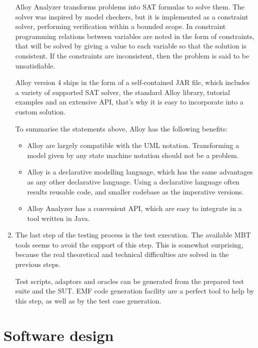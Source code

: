 \begin{enumerate}
Alloy Analyzer transforms problems into SAT formulas to solve them. The solver was inspired by model checkers, but it is implemented as a constraint solver, performing verification within a bounded scope. In constraint programming relations between variables are noted in the form of constraints, that will be solved by giving a value to each variable so that the solution is consistent. If the constraints are inconsistent, then the problem is said to be unsatisfiable.

Alloy version 4 ships in the form of a self-contained JAR file, which includes a variety of supported SAT solver, the standard Alloy library, tutorial examples and an extensive API, that's why it is easy to incorporate into a custom solution.

To summarise the statements above, Alloy has the following benefits:

\begin{itemize}
	\item Alloy are largely compatible with the UML notation. Transforming a model given by any state machine notation should not be a problem.
	\item Alloy is a declarative modelling language, which has the same advantages as any other declarative language. Using a declarative language often results reusable code, and smaller codebase as the imperative versions.
	\item Alloy Analyzer has a convenient API, which are easy to integrate in a tool written in Java.
\end{itemize}


\item The last step of the testing process is the test execution. The available MBT tools seems to avoid the support of this step. This is somewhat surprising, because the real theoretical and technical difficulties are solved in the previous steps.

Test scripts, adaptors and oracles can be generated from the prepared test suite and the SUT. EMF code generation facility are a perfect tool to help by this step, as well as by the test case generation.

\end{enumerate}

\section{Software design}
\label{sec:softwaredesign}

